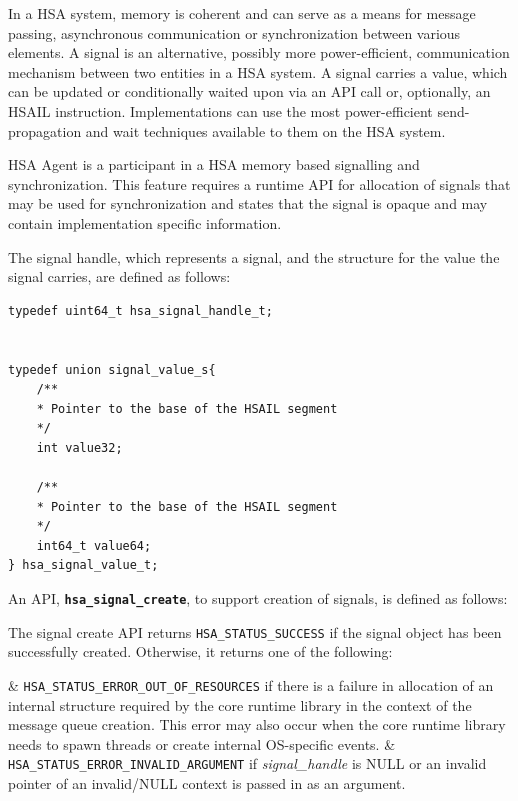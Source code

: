 \documentclass{book}
\newcommand{\diffblock}[1]{#1}
\newcommand{\ttbf}[1]{\diffblock{\texttt{\textbf{#1}}}}
\begin{document}
In a HSA system, memory is coherent and can serve as a means for
message passing, asynchronous communication or synchronization
between various elements.  A signal is an alternative, possibly more
power-efficient, communication mechanism between two entities in a
H\-S\-A system. A signal carries a value, which can be updated or
conditionally waited upon via an API call or, optionally, an HSAIL
instruction. Implementations can use the most power-efficient send-propagation
and wait techniques available to them on the  HSA system.

HSA Agent is a
participant in a HSA memory based signalling and synchronization.
This feature requires a
runtime API for allocation of signals that may be used for
synchronization and states that the signal is opaque and may contain
implementation specific information.

The signal handle, which represents a signal, and the structure for
the value the signal carries, are defined as follows:

\begin{lstlisting}
typedef uint64_t hsa_signal_handle_t;


typedef union signal_value_s{
    /**
    * Pointer to the base of the HSAIL segment
    */
    int value32;

    /**
    * Pointer to the base of the HSAIL segment
    */
    int64_t value64;
} hsa_signal_value_t;
\end{lstlisting}

An API, \ttbf{hsa\_signal\_create}, to support
creation of signals, is defined as follows:



The signal create API returns \texttt{HSA\_STATUS\_SUCCESS} if the
signal object has been successfully created. Otherwise, it returns
one of the following:

\begin{easylist}
& \texttt{HSA\_STATUS\_ERROR\_OUT\_OF\_RESOURCES} if there is a failure
in allocation of an internal structure required by the core runtime
library in the context of the message queue creation. This error may
also occur when the core runtime library needs to spawn threads or
create internal OS-specific events.
& \texttt{HSA\_STATUS\_ERROR\_INVALID\_ARGUMENT} if {\itshape
\diffblock{signal\_handle}} is NULL or an invalid pointer of an invalid/NULL
context is passed in as an argument.
\end{easylist}
\end{document}
